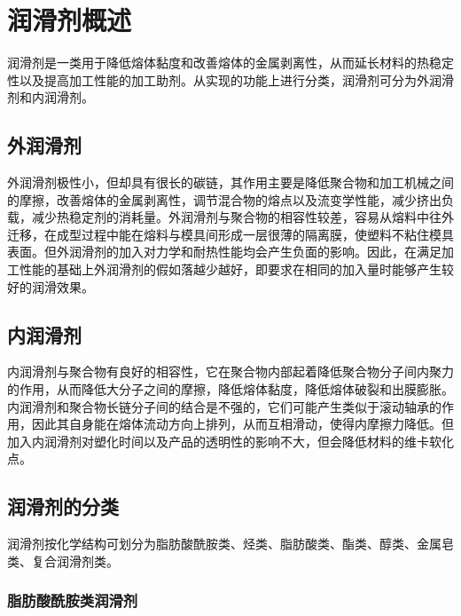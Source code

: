 \section{润滑剂概述\cite{2}}
润滑剂是一类用于降低熔体黏度和改善熔体的金属剥离性，从而延长材料的热稳定性以及提高加工性能的加工助剂。从实现的功能上进行分类，润滑剂可分为外润滑剂和内润滑剂。

\subsection{外润滑剂}
外润滑剂极性小，但却具有很长的碳链，其作用主要是降低聚合物和加工机械之间的摩擦，改善熔体的金属剥离性，调节混合物的熔点以及流变学性能，减少挤出负载，减少热稳定剂的消耗量。外润滑剂与聚合物的相容性较差，容易从熔料中往外迁移，在成型过程中能在熔料与模具间形成一层很薄的隔离膜，使塑料不粘住模具表面。但外润滑剂的加入对力学和耐热性能均会产生负面的影响。因此，在满足加工性能的基础上外润滑剂的假如落越少越好，即要求在相同的加入量时能够产生较好的润滑效果。

\subsection{内润滑剂}
内润滑剂与聚合物有良好的相容性，它在聚合物内部起着降低聚合物分子间内聚力的作用，从而降低大分子之间的摩擦，降低熔体黏度，降低熔体破裂和出膜膨胀。内润滑剂和聚合物长链分子间的结合是不强的，它们可能产生类似于滚动轴承的作用，因此其自身能在熔体流动方向上排列，从而互相滑动，使得内摩擦力降低。但加入内润滑剂对塑化时间以及产品的透明性的影响不大，但会降低材料的维卡软化点。

\subsection{润滑剂的分类}
润滑剂按化学结构可划分为脂肪酸酰胺类、烃类、脂肪酸类、酯类、醇类、金属皂类、复合润滑剂类。

\subsubsection{脂肪酸酰胺类润滑剂}

